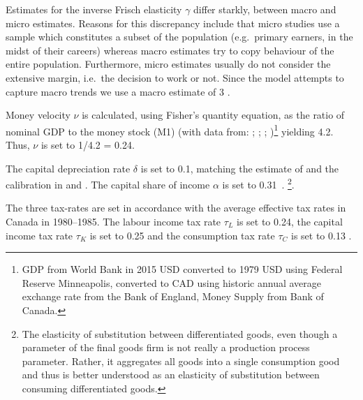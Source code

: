 \documentclass[12pt]{article}
\begin{document}
Estimates for the inverse Frisch elasticity $\gamma$ differ starkly, between macro and micro estimates. Reasons for this discrepancy
include that micro studies use a sample which constitutes a subset of the population (e.g.\ primary earners, in the midst of their careers) whereas macro 
estimates try to copy behaviour of the entire population. Furthermore, micro estimates usually do not consider the extensive margin, i.e.\ the decision 
to work or not. Since the model attempts to capture macro trends we use a macro estimate of 3 \parencite{petermanReconcilingMicroMacro2016}. 

Money velocity $\nu$ is calculated, using Fisher's quantity equation, as the ratio of nominal GDP to the money stock (M1) (with data from: \textcite{bankofenglandCanadianDollarData2021}; 
\textcite{federalreservebankofminneapolisInflationCalculatorFederal}; \textcite{worldbankgroupWorldBankNational}; \textcite{bankofcanadaSelectedMonetaryAggregates})\footnote{GDP from World Bank in 2015 USD converted to 1979 USD using Federal Reserve Minneapolis, converted to CAD using historic annual average exchange rate from 
the Bank of England, Money Supply from Bank of Canada.} yielding 4.2. Thus, $\nu$ is set to 1/4.2 = 0.24. 

The capital depreciation rate $\delta$ is set to 0.1, matching the estimate of \textcite{statisticscanadaDepreciationRatesProductivity2007} and the calibration in \textcite{someOilDemandSupply2023} and \textcite{corriganToTEMIIIBank2021}.
The capital share of income $\alpha$ is set to 0.31~\parencite{fredst.louisShareLabourCompensation2021,feenstraNextGenerationPenn2015}. 
\footnote{The elasticity of substitution between differentiated goods, even though a parameter of the final goods firm is not really a production process parameter. 
Rather, it aggregates all goods into a single consumption good and thus is better understood as an elasticity of substitution between consuming differentiated goods.}. 

The three tax-rates are set in accordance with the average effective tax rates in Canada in 1980--1985. The labour income tax rate $\tau_L$ is set to 0.24, the capital income tax rate $\tau_K$ is set to 0.25 and the consumption tax rate $\tau_C$ is set to 0.13
\parencite{careyAverageEffectiveTax2000}. 
\end{document}
